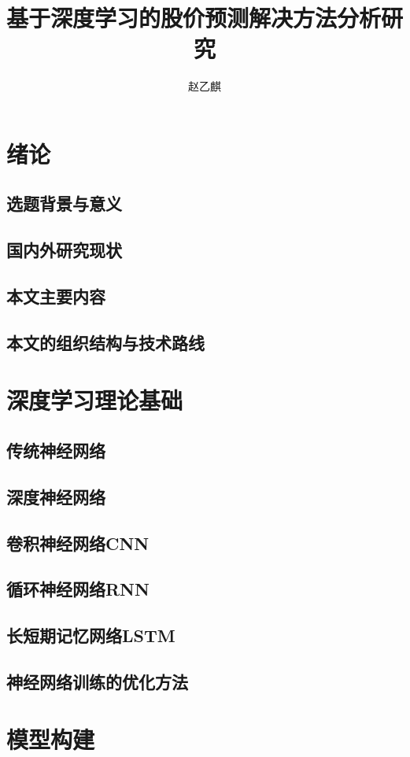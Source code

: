 \documentclass[UTF8]{ctexart}
\author{赵乙麒}
\title{基于深度学习的股价预测解决方法分析研究}
\begin{document}
\maketitle
\section{绪论}
\subsection{选题背景与意义}
\subsection{国内外研究现状}
\subsection{本文主要内容}
\subsection{本文的组织结构与技术路线}
\section{深度学习理论基础}
\subsection{传统神经网络}
\subsection{深度神经网络}
\subsection{卷积神经网络CNN}
\subsection{循环神经网络RNN}
\subsection{长短期记忆网络LSTM}
\subsection{神经网络训练的优化方法}
\section{模型构建}
\end{document}
